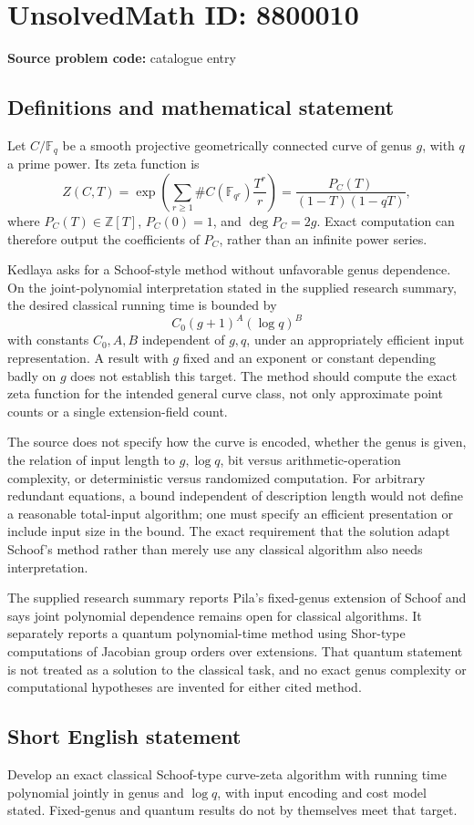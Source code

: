 \documentclass[11pt]{article}
\newcommand{\Z}{\mathbb{Z}}
\newcommand{\F}{\mathbb{F}}
\begin{document}
\section*{UnsolvedMath ID: 8800010}
\textbf{Source problem code:} catalogue entry
\subsection{Definitions and mathematical statement}
Let \(C/\F_q\) be a smooth projective geometrically connected curve of genus \(g\), with \(q\) a prime power. Its zeta function is
\[
Z(C,T)=\exp\left(\sum_{r\ge1}\#C(\F_{q^r})\frac{T^r}{r}\right)
=\frac{P_C(T)}{(1-T)(1-qT)},
\]
where \(P_C(T)\in\Z[T]\), \(P_C(0)=1\), and \(\deg P_C=2g\). Exact computation can therefore output the coefficients of \(P_C\), rather than an infinite power series.

Kedlaya asks for a Schoof-style method without unfavorable genus dependence. On the joint-polynomial interpretation stated in the supplied research summary, the desired classical running time is bounded by
\[
C_0(g+1)^A(\log q)^B
\]
with constants \(C_0,A,B\) independent of \(g,q\), under an appropriately efficient input representation. A result with \(g\) fixed and an exponent or constant depending badly on \(g\) does not establish this target. The method should compute the exact zeta function for the intended general curve class, not only approximate point counts or a single extension-field count.

The source does not specify how the curve is encoded, whether the genus is given, the relation of input length to \(g,\log q\), bit versus arithmetic-operation complexity, or deterministic versus randomized computation. For arbitrary redundant equations, a bound independent of description length would not define a reasonable total-input algorithm; one must specify an efficient presentation or include input size in the bound. The exact requirement that the solution adapt Schoof's method rather than merely use any classical algorithm also needs interpretation.

The supplied research summary reports Pila's fixed-genus extension of Schoof and says joint polynomial dependence remains open for classical algorithms. It separately reports a quantum polynomial-time method using Shor-type computations of Jacobian group orders over extensions. That quantum statement is not treated as a solution to the classical task, and no exact genus complexity or computational hypotheses are invented for either cited method.
\subsection{Short English statement}
Develop an exact classical Schoof-type curve-zeta algorithm with running time polynomial jointly in genus and \(\log q\), with input encoding and cost model stated. Fixed-genus and quantum results do not by themselves meet that target.
\end{document}
